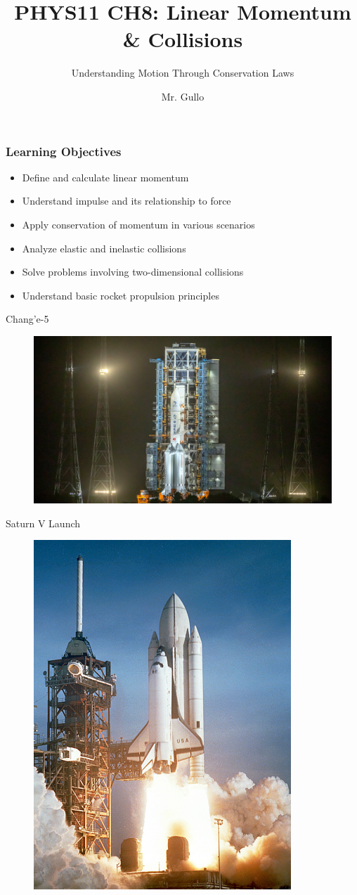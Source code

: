 \documentclass[aspectratio=169]{beamer}
\title[Linear Momentum]{PHYS11 CH8: Linear Momentum \& Collisions}
\subtitle{Understanding Motion Through Conservation Laws}
\author[Mr. Gullo]{Mr. Gullo}
\date[]{}
\begin{document}
\frame{\titlepage}

\begin{frame}
\frametitle{Learning Objectives}
\begin{itemize}
\item Define and calculate linear momentum
\item Understand impulse and its relationship to force
\item Apply conservation of momentum in various scenarios
\item Analyze elastic and inelastic collisions
\item Solve problems involving two-dimensional collisions
\item Understand basic rocket propulsion principles
\end{itemize}
\end{frame}
\begin{frame}{Chang’e-5 }
    \begin{figure}
        \centering
        \includegraphics[width=0.8\linewidth]{CH8/Change-5.jpg}
    \end{figure}
\end{frame}

\begin{frame}{Saturn V Launch}
   \begin{figure}
       \centering
       \includegraphics[width=0.4\linewidth]{CH8/Screenshot 2024-12-12 103335.png}
   \end{figure}
\end{frame}
\end{document}

